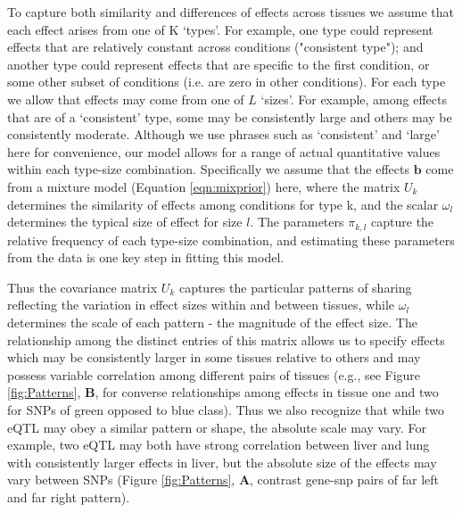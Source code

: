 To capture both similarity and differences of effects across tissues we assume that each effect arises from one of K `types'. For example, one type could represent effects that are relatively constant across conditions ("consistent type"); and another type could represent effects that are specific to the first condition, or some other subset of conditions (i.e. are zero in other conditions). For each type we allow that effects may come from one of $L$ `sizes'. For example, among effects that are of a `consistent' type, some may be consistently large and others may be consistently moderate.
Although we use phrases such as `consistent' and `large' here for convenience, our model allows for a range of actual quantitative values within each type-size combination. Specifically we assume that the effects $\bm{b}$ come from a mixture model (Equation \ref{eqn:mixprior}) here, where the matrix $U_{k}$  determines the similarity of effects among conditions for type k,  and the scalar $\omega_{l}$ determines the typical size of effect for size $l$. The parameters $\pi_{k,l}$ capture the relative frequency of each type-size combination, and estimating these parameters from the data is one key step in fitting this model. 

Thus the covariance matrix $U_{k}$ captures the particular patterns of sharing reflecting the variation in effect sizes within and between tissues, while $\omega_{l}$ determines the scale of each pattern - the magnitude of the effect size. The relationship among the distinct entries of this matrix allows us to specify effects which may be consistently larger in some tissues relative to others and may possess variable correlation among different pairs of tissues (e.g., see Figure \ref{fig:Patterns}, \textbf{B}, for converse relationships among effects in tissue one and two for SNPs of green opposed to blue class). Thus we also recognize that while two eQTL may obey a similar pattern or shape, the absolute scale may vary. For example, two eQTL may both have strong correlation between liver and lung with consistently larger effects in liver, but the absolute size of the effects may vary between SNPs (Figure \ref{fig:Patterns}, \textbf{A}, contrast gene-snp pairs of far left and far right pattern).\newline


